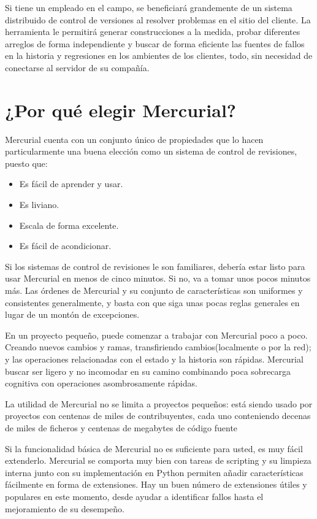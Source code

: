 Si tiene un empleado en el campo, se beneficiará grandemente de un
sistema distribuido de control de versiones al resolver problemas en
el sitio del cliente. La herramienta le permitirá generar
construcciones a la medida, probar diferentes arreglos de forma
independiente y buscar de forma eficiente las fuentes de fallos en la
historia y regresiones en los ambientes de los clientes, todo, sin
necesidad de conectarse al servidor de su compañía.

\section{¿Por qué elegir Mercurial?}

Mercurial cuenta con un conjunto único de propiedades que lo hacen
particularmente una buena elección como un sistema de control de
revisiones, puesto que:
\begin{itemize}
\item Es fácil de aprender y usar.
\item Es liviano.
\item Escala de forma excelente.
\item Es fácil de acondicionar.
\end{itemize}

Si los sistemas de control de revisiones le son familiares, debería
estar listo para usar Mercurial en menos de cinco minutos. Si no, va a
tomar unos pocos minutos más. Las órdenes de Mercurial y su conjunto
de características son uniformes y consistentes generalmente, y basta
con que siga unas pocas reglas generales en lugar de un montón de
excepciones.

En un proyecto pequeño, puede comenzar a trabajar con Mercurial poco a
poco. Creando nuevos cambios y ramas, transfiriendo cambios(localmente
o por la red); y las operaciones relacionadas con el estado y la
historia son rápidas. Mercurial buscar ser ligero y no incomodar en su
camino combinando poca sobrecarga cognitiva con operaciones
asombrosamente rápidas.

La utilidad de Mercurial no se limita a proyectos pequeños: está
siendo usado por proyectos con centenas de miles de contribuyentes,
cada uno conteniendo decenas de miles de ficheros y centenas de
megabytes de código fuente

Si la funcionalidad básica de Mercurial no es suficiente para usted,
es muy fácil extenderlo. Mercurial se comporta muy bien con tareas de
scripting y su limpieza interna junto con su implementación en Python
permiten añadir características fácilmente en forma de extensiones.
Hay un buen número de extensiones útiles y populares en este momento,
desde ayudar a identificar fallos hasta el mejoramiento de su
desempeño.

